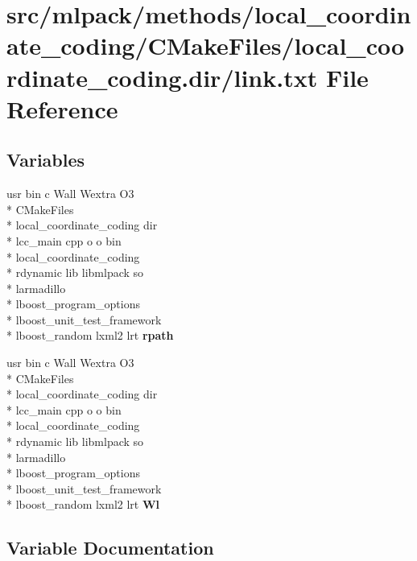 \section{src/mlpack/methods/local\-\_\-coordinate\-\_\-coding/\-C\-Make\-Files/local\-\_\-coordinate\-\_\-coding.dir/link.txt File Reference}
\label{methods_2local__coordinate__coding_2CMakeFiles_2local__coordinate__coding_8dir_2link_8txt}
\subsection*{Variables}
\begin{DoxyCompactItemize}
\item 
usr bin c Wall Wextra O3 \\*
C\-Make\-Files \\*
local\-\_\-coordinate\-\_\-coding dir \\*
lcc\-\_\-main cpp o o bin \\*
local\-\_\-coordinate\-\_\-coding \\*
rdynamic lib libmlpack so \\*
larmadillo \\*
lboost\-\_\-program\-\_\-options \\*
lboost\-\_\-unit\-\_\-test\-\_\-framework \\*
lboost\-\_\-random lxml2 lrt {\bf rpath}
\item 
usr bin c Wall Wextra O3 \\*
C\-Make\-Files \\*
local\-\_\-coordinate\-\_\-coding dir \\*
lcc\-\_\-main cpp o o bin \\*
local\-\_\-coordinate\-\_\-coding \\*
rdynamic lib libmlpack so \\*
larmadillo \\*
lboost\-\_\-program\-\_\-options \\*
lboost\-\_\-unit\-\_\-test\-\_\-framework \\*
lboost\-\_\-random lxml2 lrt {\bf Wl}
\end{DoxyCompactItemize}


\subsection{Variable Documentation}
